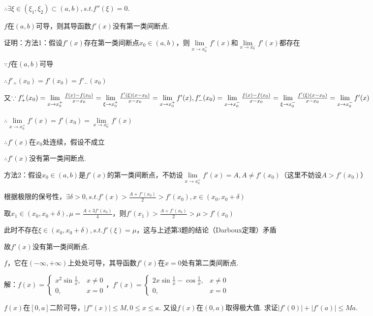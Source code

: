 \documentclass[12pt,UTF8]{ctexart}
\begin{document}
\begin{enumerate}
$\therefore\exists\xi\in(\xi_1,\xi_2)\subset(a,b),s.t.f''(\xi)=0$.

$f$在$(a,b)$可导，则其导函数$f'(x)$没有第一类间断点.

证明：方法1：假设$f'(x)$存在第一类间断点$x_0\in(a,b)$，则$\lim\limits_{x\rightarrow x_0^+}f'(x)$和$\lim\limits_{x\rightarrow x_0^-}f'(x)$都存在

$\because f$在$(a,b)$可导

$\therefore f'_+(x_0)=f'(x_0)=f'_-(x_0)$

又$\because f'_+(x_0)=\lim\limits_{x\rightarrow x_0^+}\frac{f(x)-f(x_0)}{x-x_0}=\lim\limits_{\xi\rightarrow x_0^+}\frac{f'(\xi)(x-x_0)}{x-x_0}=\lim\limits_{x\rightarrow x_0^+}f'(x),f'_-(x_0)=\lim\limits_{x\rightarrow x_0^-}\frac{f(x)-f(x_0)}{x-x_0}\\
=\lim\limits_{\xi\rightarrow x_0^-}\frac{f'(\xi)(x-x_0)}{x-x_0}=\lim\limits_{x\rightarrow x_0^-}f'(x)$

$\therefore\lim\limits_{x\rightarrow x_0^+}f'(x)=f'(x_0)=\lim\limits_{x\rightarrow x_0^-}f'(x)$

$\therefore f'(x)$在$x_0$处连续，假设不成立

$\therefore f'(x)$没有第一类间断点.

方法2：假设$x_0\in(a,b)$是$f'(x)$的第一类间断点，不妨设$\lim\limits_{x\rightarrow x_0^+}f'(x)=A,A\neq f'(x_0)$（这里不妨设$A>f'(x_0)$）

根据极限的保号性，$\exists\delta>0,s.t.f'(x)>\frac{A+f'(x_0)}2>f'(x_0),x\in(x_0,x_0+\delta)$

取$x_1\in(x_0,x_0+\delta),\mu=\frac{A+3f'(x_0)}4$，则$f'(x_1)>\frac{A+f'(x_0)}2>\mu>f'(x_0)$

此时不存在$\xi\in(x_0,x_0+\delta),s.t.f'(\xi)=\mu$，这与上述第3题的结论（Darboux定理）矛盾

故$f'(x)$没有第一类间断点.

$f$，它在$(-\infty,+\infty)$上处处可导，其导函数$f'(x)$在$x=0$处有第二类间断点.

解：$f(x)=\begin{cases}
x^2\sin\frac1x,&x\neq0\\
0,&x=0
\end{cases}$，$f'(x)=\begin{cases}
2x\sin\frac1x-\cos\frac1x,&x\neq0\\
0,&x=0
\end{cases}$

$f(x)$在$[0,a]$二阶可导，$|f''(x)|\leq M,0\leq x\leq a$. 又设$f(x)$在$(0,a)$取得极大值. 求证$|f'(0)|+|f'(a)|\leq Ma$.


\end{enumerate}
\end{document}
